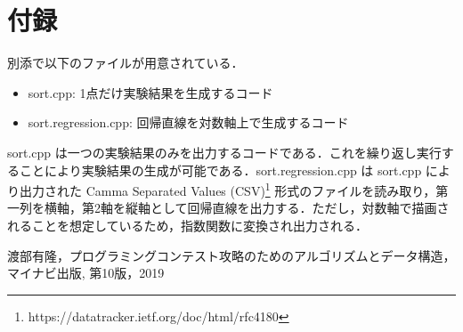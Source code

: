 \documentclass[fleqn, a4paper. 12pt]{ltjsarticle} %
\begin{document}
    \section{付録}
    別添で以下のファイルが用意されている．
    \begin{itemize}
        \item sort.cpp: 1点だけ実験結果を生成するコード　
        \item sort.regression.cpp: 回帰直線を対数軸上で生成するコード
    \end{itemize}
    sort.cpp は一つの実験結果のみを出力するコードである．これを繰り返し実行することにより実験結果の生成が可能である．sort.regression.cpp は sort.cpp により出力された Camma Separated Values (CSV)\footnote{https://datatracker.ietf.org/doc/html/rfc4180} 形式のファイルを読み取り，第一列を横軸，第2軸を縦軸として回帰直線を出力する．ただし，対数軸で描画されることを想定しているため，指数関数に変換され出力される．

    \begin{thebibliography}{00}
        渡部有隆，プログラミングコンテスト攻略のためのアルゴリズムとデータ構造，マイナビ出版, 第10版，2019
        \end{thebibliography}
\end{document}
